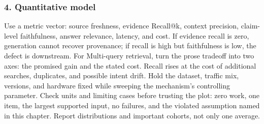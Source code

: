 \subsubsection*{4. Quantitative model}
Use a metric vector: source freshness, evidence Recall@k, context precision, claim-level faithfulness, answer relevance, latency, and cost. If evidence recall is zero, generation cannot recover provenance; if recall is high but faithfulness is low, the defect is downstream.
For Multi-query retrieval, turn the prose tradeoff into two axes: the promised gain and the stated cost. Recall rises at the cost of additional searches, duplicates, and possible intent drift. Hold the dataset, traffic mix, versions, and hardware fixed while sweeping the mechanism's controlling parameter.
Check units and limiting cases before trusting the plot: zero work, one item, the largest supported input, no failures, and the violated assumption named in this chapter. Report distributions and important cohorts, not only one average.
